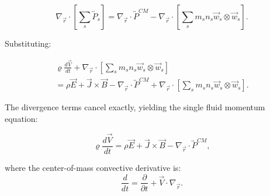 \begin{equation*}
\nabla_{\vec{r}} \cdot \left[\sum_s \overleftrightarrow{P}_s\right] = \nabla_{\vec{r}} \cdot \overleftrightarrow{P}^{CM} - \nabla_{\vec{r}} \cdot \left[\sum_s m_s n_s \vec{w}_s \otimes \vec{w}_s\right].
\end{equation*}

Substituting:

\begin{multline}
\varrho \frac{d\vec{V}}{dt} + \nabla_{\vec{r}} \cdot \left[\sum_s m_s n_s \vec{w}_s \otimes \vec{w}_s\right] \\
= \rho \vec{E} + \vec{J} \times \vec{B} - \nabla_{\vec{r}} \cdot \overleftrightarrow{P}^{CM} + \nabla_{\vec{r}} \cdot \left[\sum_s m_s n_s \vec{w}_s \otimes \vec{w}_s\right].
\end{multline}

The divergence terms cancel exactly, yielding the single fluid momentum equation:

\begin{equation}
\varrho \frac{d\vec{V}}{dt} = \rho \vec{E} + \vec{J} \times \vec{B} - \nabla_{\vec{r}} \cdot \overleftrightarrow{P}^{CM},
\label{eq:single_fluid_momentum}
\end{equation}

where the center-of-mass convective derivative is:
\begin{equation*}
\frac{d}{dt} = \frac{\partial}{\partial t} + \vec{V} \cdot \nabla_{\vec{r}}.
\end{equation*}